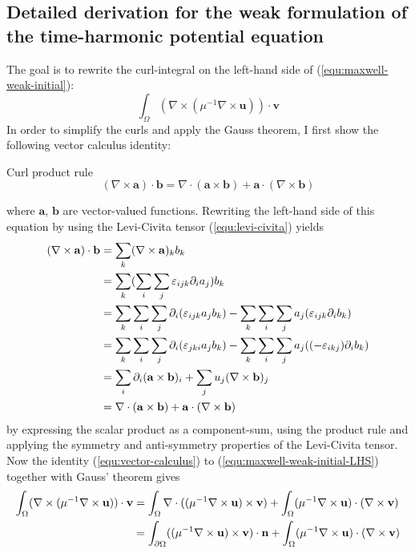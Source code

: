 \documentclass[11pt, a4paper]{article}
\begin{document}
\subsection*{Detailed derivation for the weak formulation of the time-harmonic potential equation}
\label{subsec:derivation}

The goal is to rewrite the curl-integral on the left-hand side of 
(\ref{equ:maxwell-weak-initial}):
\begin{equation}
    \int_{\Omega} (\nabla \times (\mu^{-1} \nabla \times \mathbf{u})) \cdot \mathbf{v} \label{equ:maxwell-weak-initial-LHS}
\end{equation}
In order to simplify the curls and apply the Gauss theorem, I first show
the following vector calculus identity:
\begin{fancybox}{Curl product rule}
    \begin{equation}
        (\nabla \times \mathbf{a}) \cdot \mathbf{b} = \nabla \cdot (\mathbf{a} \times \mathbf{b}) + \mathbf{a} \cdot (\nabla \times \mathbf{b}) \label{equ:vector-calculus}
    \end{equation}
\end{fancybox}
where $\mathbf{a}$, $\mathbf{b}$ are vector-valued functions. Rewriting the 
left-hand side of this equation by using the Levi-Civita tensor (\ref{equ:levi-civita})
yields
\begin{align}
    (\nabla \times \mathbf{a}) \cdot \mathbf{b} &= \sum_k (\nabla \times \mathbf{a})_k b_k \notag \\ 
    &= \sum_k (\sum_i \sum_j \varepsilon_{ijk} \partial_i a_j) b_k \notag \\ 
    &= \sum_k \sum_i \sum_j \partial_i (\varepsilon_{ijk} a_j b_k) - \sum_k \sum_i \sum_j a_j (\varepsilon_{ijk} \partial_i b_k) \notag \\ 
    &= \sum_k \sum_i \sum_j \partial_i (\varepsilon_{jki} a_j b_k) - \sum_k \sum_i \sum_j a_j ((-\varepsilon_{ikj}) \partial_i b_k) \notag \\ 
    &= \sum_i \partial_i (\mathbf{a} \times \mathbf{b})_i + \sum_j u_j (\nabla \times \mathbf{b})_j \notag \\ 
    &= \nabla \cdot (\mathbf{a} \times \mathbf{b}) + \mathbf{a} \cdot (\nabla \times \mathbf{b}) \label{equ:curlidentity} 
\end{align}
by expressing the scalar product as a component-sum, using the product rule and
applying the symmetry and anti-symmetry properties of the Levi-Civita tensor.
Now the identity (\ref{equ:vector-calculus}) to (\ref{equ:maxwell-weak-initial-LHS})
together with Gauss' theorem gives
\begin{align}
    \int_{\Omega} (\nabla \times ({\mu^{-1} \nabla \times \mathbf{u}})) \cdot \mathbf{v} &=
    \int_{\Omega} \nabla \cdot (({\mu^{-1} \nabla \times \mathbf{u}}) \times \mathbf{v})
    + \int_{\Omega} ({\mu^{-1} \nabla \times \mathbf{u}}) \cdot (\nabla \times \mathbf{v}) \notag \\
    &= \int_{\partial \Omega} (({\mu^{-1} \nabla \times \mathbf{u}}) \times \mathbf{v}) \cdot \mathbf{n}
    + \int_{\Omega} ({\mu^{-1} \nabla \times \mathbf{u}}) \cdot (\nabla \times \mathbf{v}) \notag \\
\end{align}
\end{document}
